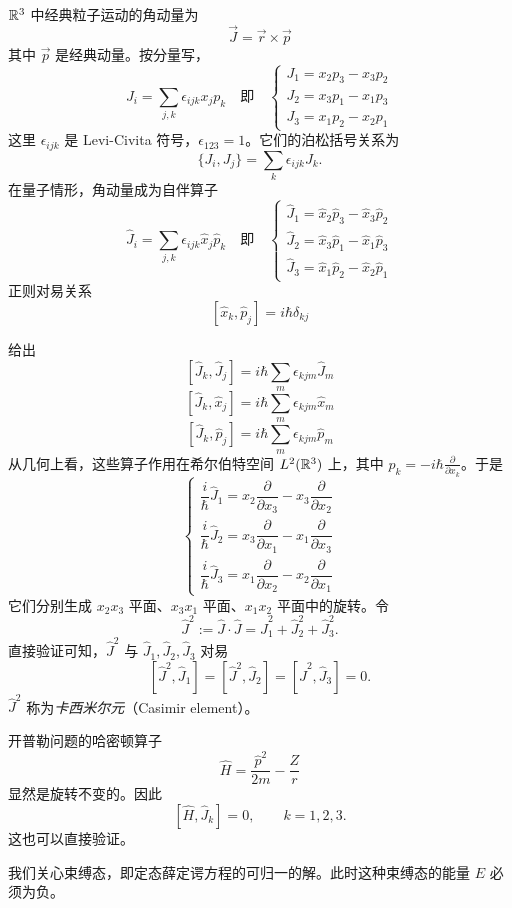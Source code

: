 \(\mathbb{R}^3\) 中经典粒子运动的角动量为
\[
  \vec J=\vec r\times\vec p
\]
其中 \(\vec p\) 是经典动量。按分量写，
\[
  J_i=\sum_{j,k}\epsilon_{ijk}x_jp_k
  \quad\text{即}\quad
  \begin{cases}
    J_1=x_2p_3-x_3p_2\\
    J_2=x_3p_1-x_1p_3\\
    J_3=x_1p_2-x_2p_1
  \end{cases}
\]
这里 \(\epsilon_{ijk}\) 是 Levi-Civita 符号，\(\epsilon_{123}=1\)。它们的泊松括号关系为
\[
  \{J_i,J_j\}=\sum_{k}\epsilon_{ijk}J_k.
\]
在量子情形，角动量成为自伴算子
\[
  \hat J_i=\sum_{j,k}\epsilon_{ijk}\hat x_j\hat p_k
  \quad\text{即}\quad
  \begin{cases}
    \hat J_1=\hat x_2\hat p_3-\hat x_3\hat p_2\\
    \hat J_2=\hat x_3\hat p_1-\hat x_1\hat p_3\\
    \hat J_3=\hat x_1\hat p_2-\hat x_2\hat p_1
  \end{cases}
\]
正则对易关系
\[
  [\hat x_k,\hat p_j]=i\hbar\delta_{kj}
\]

给出
\[
  [\hat J_k,\hat J_j]=i\hbar\sum_m\epsilon_{kjm}\hat J_m
\]
\[
  [\hat J_k,\hat x_j]=i\hbar\sum_m\epsilon_{kjm}\hat x_m
\]
\[
  [\hat J_k,\hat p_j]=i\hbar\sum_m\epsilon_{kjm}\hat p_m
\]
从几何上看，这些算子作用在希尔伯特空间 \(L^2(\mathbb{R}^3)\) 上，其中 \(p_k=-i\hbar\frac{\partial}{\partial x_k}\)。于是
\[
  \begin{cases}
    \dfrac{i}{\hbar}\hat J_1=x_2\dfrac{\partial}{\partial x_3}-x_3\dfrac{\partial}{\partial x_2}\\[8pt]
    \dfrac{i}{\hbar}\hat J_2=x_3\dfrac{\partial}{\partial x_1}-x_1\dfrac{\partial}{\partial x_3}\\[8pt]
    \dfrac{i}{\hbar}\hat J_3=x_1\dfrac{\partial}{\partial x_2}-x_2\dfrac{\partial}{\partial x_1}
  \end{cases}
\]
它们分别生成 \(x_2x_3\) 平面、\(x_3x_1\) 平面、\(x_1x_2\) 平面中的旋转。令
\[
  \hat J^2:=\hat J\cdot\hat J=\hat J_1^2+\hat J_2^2+\hat J_3^2.
\]
直接验证可知，\(\hat J^2\) 与 \(\hat J_1,\hat J_2,\hat J_3\) 对易
\[
  [\hat J^2,\hat J_1]=[\hat J^2,\hat J_2]=[\hat J^2,\hat J_3]=0.
\]
\(\hat J^2\) 称为\emph{卡西米尔元}（Casimir element）。

开普勒问题的哈密顿算子
\[
  \hat H=\frac{\hat p^2}{2m}-\frac{Z}{r}
\]
显然是旋转不变的。因此
\[
  [\hat H,\hat J_k]=0,\qquad k=1,2,3.
\]
这也可以直接验证。

我们关心束缚态，即定态薛定谔方程的可归一的解。此时这种束缚态的能量 \(E\) 必须为负。

